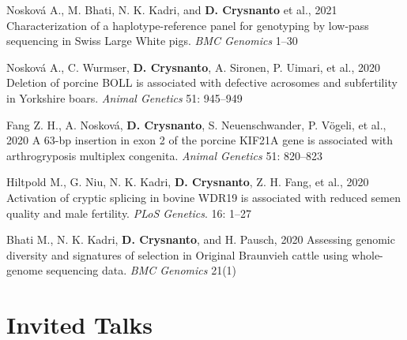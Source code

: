 \documentclass[letterpaper,10pt]{article}
\begin{document}
\begin{enumerate}[leftmargin=0.3in]
    \setcounter{enumi}{4}

    \small{

    \item{Nosková A., M. Bhati, N. K. Kadri, and \textbf{D. Crysnanto} et al., 2021 Characterization of a haplotype-reference panel for genotyping by low-pass sequencing in Swiss Large White pigs. \emph{BMC Genomics} 1–30}
      
    \item{Nosková A., C. Wurmser, \textbf{D. Crysnanto}, A. Sironen, P. Uimari, et al., 2020 Deletion of porcine BOLL is associated with defective acrosomes and subfertility in Yorkshire boars. \textit{Animal Genetics} 51: 945–949}
    
    \item{Fang Z. H., A. Nosková, \textbf{D. Crysnanto}, S. Neuenschwander, P. Vögeli, et al., 2020 A 63-bp insertion in exon 2 of the porcine KIF21A gene is associated with arthrogryposis multiplex congenita. \textit{Animal Genetics} 51: 820–823}
    
    \item{Hiltpold M., G. Niu, N. K. Kadri, \textbf{D. Crysnanto}, Z. H. Fang, et al., 2020 Activation of cryptic splicing in bovine WDR19 is associated with reduced semen quality and male fertility. \textit{PLoS Genetics}. 16: 1–27}
    
    \item{Bhati M., N. K. Kadri, \textbf{D. Crysnanto}, and H. Pausch, 2020 Assessing genomic diversity and signatures of selection in Original Braunvieh cattle using whole-genome sequencing data. \emph{BMC Genomics} 21(1)} 

}

\end{enumerate}

\section{Invited Talks}
   
\end{document}
